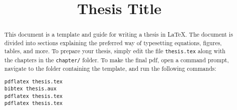 \documentclass{thesis}
\title{Thesis Title}
\theoremstyle{definition}
\begin{document}
\frontmatter


\maketitle

\setcounter{page}{3}

\begin{abstract}
  This document is a template and guide for writing a thesis in \LaTeX. The document is divided into sections explaining the preferred way of typesetting equations, figures, tables, and more. To prepare your thesis, simply edit the file \texttt{thesis.tex} along with the chapters in the \texttt{chapter/} folder. To make the final pdf, open a command prompt, navigate to the folder containing the template, and run the following commands:
  
  \texttt{pdflatex thesis.tex}\\
  \texttt{bibtex thesis.aux}\\
  \texttt{pdflatex thesis.tex}\\
  \texttt{pdflatex thesis.tex}
\end{abstract}

\tableofcontents

\lot

\lof







\mainmatter






\appendices


\backmatter


\renewcommand\bibname{References}

\end{document}
